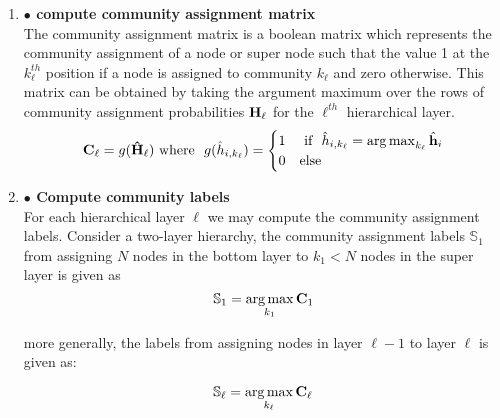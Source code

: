 \documentclass[a4paper,12pt]{article}
\DeclareMathOperator*{\argmax}{arg\,max}
\begin{document}
\begin{itemize}
\begin{enumerate}
{\begin{enumerate}
{					\[\hat{\bf H}_\ell = \begin{bmatrix}
						\hat{h}_{1, 1} & \cdots & \hat{h}_{1, k_\ell} \\
						\vdots  & \ddots & \vdots \\
						\hat{h}_{k_{\ell - 1}, 1} & \cdots & \hat{h}_{k_{\ell -1}, k_\ell} 
					\end{bmatrix}\]
				}
				
				
				\item[]{\textbf{$\bullet$ compute community assignment matrix} \\ 
					The community assignment matrix is a boolean matrix which represents the community assignment of a node or super node such that the value 1 at the $k_\ell^{th}$ position if a node is assigned to community $k_\ell$ and zero otherwise. This matrix can be obtained by taking the argument maximum over the rows of community assignment probabilities ${\bf H}_\ell$ for the $\ell^{th}$ hierarchical layer.  
					\[{\bf C}_{\ell} = g({\bf \hat{H}}_{\ell}) \ \text{where} \ \  g(\hat{h}_{i,k_\ell}) = 
					\begin{cases} 1 & \ \text{if} \ \ \hat{h}_{i,k_\ell} = \argmax_{k_\ell} \hat{\bf h}_i \\ %
						0 & \text{else} %
					\end{cases}\]}
				
				\item[]{\textbf{$\bullet$ Compute community labels} \\
					For each hierarchical layer $\ell$ we may compute the community assignment labels. Consider a two-layer hierarchy, the community assignment labels $\mathbb{S}_1$ from assigning $N$ nodes in the bottom layer to $k_1 < N$ nodes in the super layer is given as 
					\[\mathbb{S}_1 = \argmax_{k_1} {\bf C}_1 \]
					
					more generally, the labels from assigning nodes in layer $\ell - 1$ to layer $\ell$ is given as:
					
					\[ \mathbb{S}_\ell = \argmax_{k_\ell} {\bf C}_{\ell}\]}
				

\end{enumerate}}
\end{enumerate}
\end{itemize}
\end{document}
